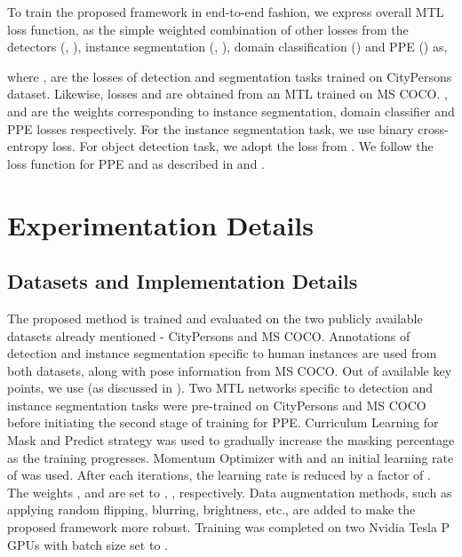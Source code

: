 \documentclass[a4paper,11pt]{article}
\begin{document}
To train the proposed framework in end-to-end fashion, we express overall MTL loss function,  as the simple weighted combination of other losses from the detectors (, ), instance segmentation (, ), domain classification () and PPE () as,

where ,  are the losses of detection and segmentation tasks trained on CityPersons dataset. Likewise, losses  and  are obtained from an MTL trained on MS COCO. ,  and  are the weights corresponding to instance segmentation, domain classifier and PPE losses respectively. For the instance segmentation task, we use binary cross-entropy loss. For object detection task, we adopt the loss from \cite{dasgupta2022spatio}. We follow  the loss function for PPE and  as described in \cite{kishore2019cluenet} and \cite{kocabas2018multiposenet}. 
\section{Experimentation Details}

\subsection{Datasets and Implementation Details}

The proposed method is trained and evaluated on the two publicly available datasets already mentioned - CityPersons and MS COCO. Annotations of detection and instance segmentation specific to human instances are used from both datasets, along with pose information from MS COCO. Out of  available key points, we use  (as discussed in \cite{kishore2019cluenet}). Two MTL networks specific to detection and instance segmentation tasks were pre-trained on CityPersons and MS COCO before initiating the second stage of training for PPE. Curriculum Learning for Mask and Predict strategy was used to gradually increase the masking percentage as the training progresses. Momentum Optimizer with  and an initial learning rate of  was used. After each  iterations, the learning rate is reduced by a factor of . The weights ,  and  are set to , ,  respectively. Data augmentation methods, such as applying random flipping, blurring, brightness, etc., are added to make the proposed framework more robust. Training was completed on two Nvidia Tesla P GPUs with batch size set to .  
\end{document}
